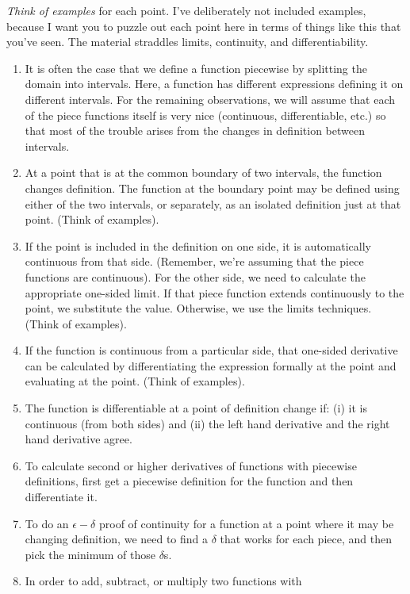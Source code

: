 \documentclass[10pt]{amsart}
\begin{document}
{\em Think of examples} for each point. I've deliberately not included
examples, because I want you to puzzle out each point here in terms of
things like this that you've seen. The material straddles limits,
continuity, and differentiability.

\begin{enumerate}
\item It is often the case that we define a function piecewise by
  splitting the domain into intervals. Here, a function has different
  expressions defining it on different intervals. For the remaining
  observations, we will assume that each of the piece functions itself
  is very nice (continuous, differentiable, etc.) so that most of the
  trouble arises from the changes in definition between intervals.
\item At a point that is at the common boundary of two intervals, the
  function changes definition. The function at the boundary point may
  be defined using either of the two intervals, or separately, as an
  isolated definition just at that point. (Think of examples).
\item If the point is included in the definition on one side, it is
  automatically continuous from that side. (Remember, we're assuming
  that the piece functions are continuous). For the other side, we
  need to calculate the appropriate one-sided limit. If that piece
  function extends continuously to the point, we substitute the
  value. Otherwise, we use the limits techniques. (Think of examples).
\item If the function is continuous from a particular side, that
  one-sided derivative can be calculated by differentiating the
  expression formally at the point and evaluating at the point. (Think
  of examples).
\item The function is differentiable at a point of definition change
  if: (i) it is continuous (from both sides) and (ii) the left hand
  derivative and the right hand derivative agree.
\item To calculate second or higher derivatives of functions with
  piecewise definitions, first get a piecewise definition for the
  function and then differentiate it.
\item To do an $\epsilon-\delta$ proof of continuity for a function at
  a point where it may be changing definition, we need to find a
  $\delta$ that works for each piece, and then pick the minimum of
  those $\delta$s.
\item In order to add, subtract, or multiply two functions with

\end{enumerate}
\end{document}
